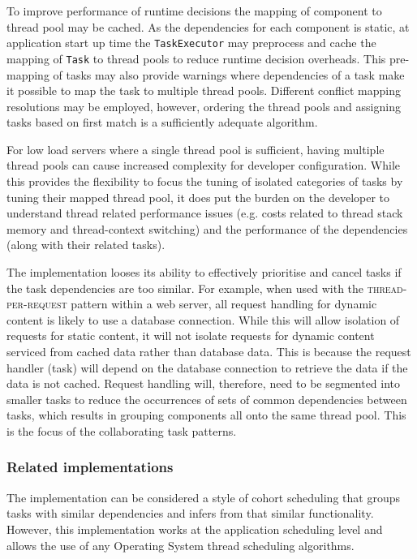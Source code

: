 \documentclass[prodmode]{style/acmlarge}
\begin{document}
To improve performance of runtime decisions the mapping of component to thread
pool may be cached.  As the dependencies for each component is static, at
application start up time the \texttt{TaskExecutor} may preprocess and
cache the mapping of \texttt{Task} to thread pools to reduce runtime
decision overheads.  This pre-mapping of tasks may also provide warnings
where dependencies of a task make it possible to map the task to
multiple thread pools.  Different conflict mapping resolutions may be employed,
however, ordering the thread pools and assigning tasks based on first match
is a sufficiently adequate algorithm.

For low load servers where a single thread pool is sufficient, having multiple
thread pools can cause increased complexity for developer configuration.  While
this provides the flexibility to focus the tuning of isolated categories of
tasks by tuning their mapped thread pool, it does put the burden on the
developer to understand thread related performance issues (e.g. costs related to
thread stack memory and thread-context switching) and the performance of the
dependencies (along with their related tasks).

The implementation looses its ability to effectively prioritise and cancel tasks
if the task dependencies are too similar.  For example, when used with the
\textsc{thread-per-request} pattern within a web server, all request handling
for dynamic content is likely to use a database connection.  While this will
allow isolation of requests for static content, it will not isolate requests for
dynamic content serviced from cached data rather than database data.  This is
because the request handler (task) will depend on the database connection to
retrieve the data if the data is not cached.  Request handling will, therefore,
need to be segmented into smaller tasks to reduce the occurrences of sets of
common dependencies between tasks, which results in grouping components all onto
the same thread pool.  This is the focus of the collaborating task patterns.


\subsubsection*{Related implementations}

The implementation can be considered a style of cohort scheduling \cite{cohort}
that groups tasks with similar dependencies and infers from that similar
functionality.  However, this implementation works at the application scheduling
level and allows the use of any Operating System thread scheduling algorithms.
\end{document}
